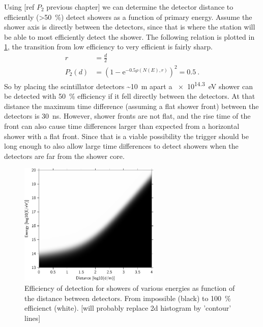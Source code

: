 Using [ref $P_2$ previous chapter] we can determine the detector distance to efficiently (\SI{>50}{\percent}) detect showers as a function of primary energy. Assume the shower axis is directly between the detectors, since that is where the station will be able to most efficiently detect the shower. The following relation is plotted in \cref{fig:efficiency_distance_energy}, the transition from low efficiency to very efficient is fairly sharp.
%
\begin{equation}
\begin{split}
    r &= \frac{d}{2} \\
    P_2(d) &= \left(1 - \mathrm{e}^{-0.5 \rho(N(E), r)} \right)^2 = 0.5 \ .
\end{split}
\end{equation}
%
So by placing the scintillator detectors \SI{~10}{\meter} apart a \SI{e14.3}{\eV} shower can be detected with \SI{50}{\percent} efficiency if it fell directly between the detectors. At that distance the maximum time difference (assuming a flat shower front) between the detectors is \SI{30}{\ns}. However, shower fronts are not flat, and the rise time of the front can also cause time differences larger than expected from a horizontal shower with a flat front. Since that is a viable possibility the trigger should be long enough to also allow large time differences to detect showers when the detectors are far from the shower core.

\begin{figure}
    \centering
    \includegraphics[width=0.6\textwidth]
                    {plots/station/efficiency_distance_energy}
    \caption{Efficiency of detection for showers of various energies as function of the distance between detectors. From impossible (black) to \SI{100}{\percent} efficienct (white). [will probably replace 2d histogram by 'contour' lines]}
    \label{fig:efficiency_distance_energy}
\end{figure}

